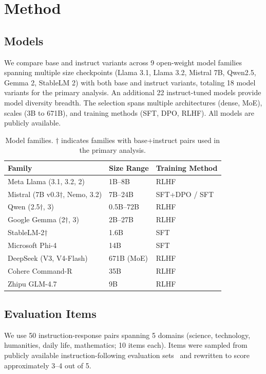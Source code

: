 \documentclass[11pt,twocolumn]{article}
\begin{document}
\section{Method}

\subsection{Models}
We compare base and instruct variants across 9 open-weight model families spanning multiple size checkpoints (Llama 3.1, Llama 3.2, Mistral 7B, Qwen2.5, Gemma 2, StableLM 2) with both base and instruct variants, totaling 18 model variants for the primary analysis. An additional 22 instruct-tuned models provide model diversity breadth. The selection spans multiple architectures (dense, MoE), scales (3B to 671B), and training methods (SFT, DPO, RLHF). All models are publicly available.

\begin{table}[h]
\centering\small
\caption{Model families. $\dagger$ indicates families with base+instruct pairs used in the primary analysis.}
\label{tab:models}
\begin{tabular}{lll}
\toprule
\textbf{Family} & \textbf{Size Range} & \textbf{Training Method} \\
\midrule
Meta Llama (3.1, 3.2, 2) & 1B--8B & RLHF \\
Mistral (7B v0.3$\dagger$, Nemo, 3.2) & 7B--24B & SFT+DPO / SFT \\
Qwen (2.5$\dagger$, 3) & 0.5B--72B & RLHF \\
Google Gemma (2$\dagger$, 3) & 2B--27B & RLHF \\
StableLM-2$\dagger$ & 1.6B & SFT \\
Microsoft Phi-4 & 14B & SFT \\
DeepSeek (V3, V4-Flash) & 671B (MoE) & RLHF \\
Cohere Command-R & 35B & RLHF \\
Zhipu GLM-4.7 & 9B & RLHF \\
\bottomrule
\end{tabular}
\end{table}

\subsection{Evaluation Items}
We use 50 instruction-response pairs spanning 5 domains (science, technology, humanities, daily life, mathematics; 10 items each). Items were sampled from publicly available instruction-following evaluation sets~\cite{alpacaeval,zheng2023judging} and rewritten to score approximately 3--4 out of 5.
\end{document}
